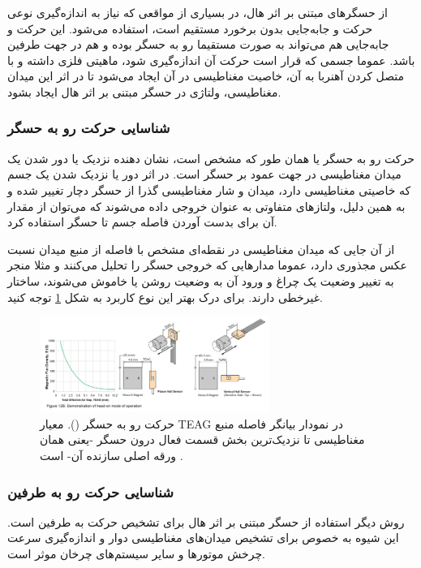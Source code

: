 از حسگر‌های مبتنی بر اثر هال، در بسیاری از مواقعی که نیاز به اندازه‌گیری نوعی حرکت و جابه‌جایی بدون برخورد مستقیم است، استفاده می‌شود. این حرکت و جا‌به‌جایی هم می‌تواند به صورت مستقیما رو به حسگر بوده و هم در جهت طرفین باشد. عموما جسمی که قرار است حرکت‌ آن اندازه‌گیری شود، ماهیتی فلزی داشته و با متصل کردن آهنربا به آن، خاصیت مغناطیسی در آن ایجاد می‌شود تا در اثر این میدان مغناطیسی، ولتاژی در حسگر مبتنی بر اثر هال ایجاد بشود.

\subsubsection{شناسایی حرکت رو به حسگر}

حرکت رو به حسگر یا  همان طور که مشخص است، نشان دهنده نزدیک یا دور شدن یک میدان مغناطیسی در جهت عمود بر حسگر است. در اثر دور یا نزدیک شدن یک جسم که خاصیتی مغناطیسی دارد، میدان و شار مغناطیسی گذرا از حسگر دچار تغییر شده و به همین دلیل، ولتاز‌های متفاوتی به عنوان خروجی داده می‌شوند که می‌توان از مقدار آن برای بدست آوردن فاصله جسم تا حسگر استفاده کرد.

از آن جایی که میدان مغناطیسی در نقطه‌ای مشخص با فاصله از منبع میدان نسبت عکس مجذوری دارد، عموما مدارهایی که خروجی حسگر را تحلیل می‌کنند و مثلا منجر به تغییر وضعیت یک چراغ و ورود آن به وضعیت روشن یا خاموش می‌شوند، ساختار غیرخطی دارند. برای درک بهتر این نوع کاربرد به شکل
\ref{fig:4}
توجه کنید.

\begin{figure}[t]
	
	\centering 
	\includegraphics[width=75mm]{Images/head.png}
	\caption{حرکت رو به حسگر ().
		معیار TEAG در نمودار بیانگر فاصله منبع مغناطیسی تا نزدیک‌ترین بخش قسمت فعال درون حسگر -یعنی همان ورقه اصلی سازنده آن- است
		\cite{alleg}.
	}\label{fig:4}
\end{figure}

\subsubsection{شناسایی حرکت رو به طرفین}


روش دیگر استفاده از حسگر مبتنی بر اثر هال برای تشخیص حرکت به طرفین است. این شیوه به خصوص برای تشخیص میدان‌های مغناطیسی دوار و اندازه‌گیری سرعت چرخش موتور‌ها و سایر سیستم‌های چرخان موثر است.

